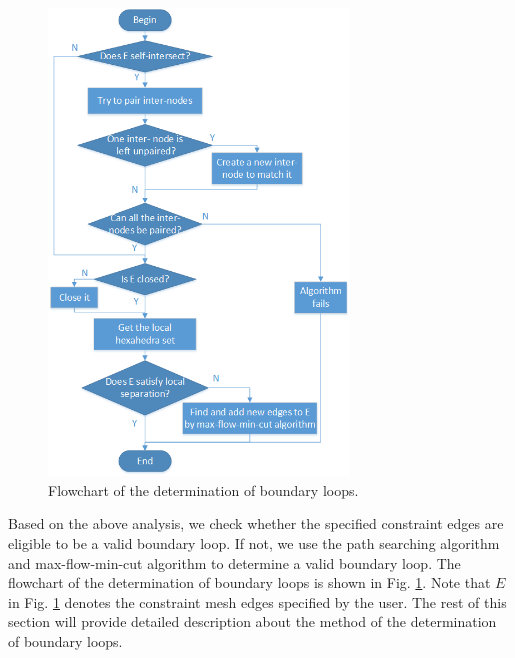 \documentclass[final,5p,times,twocolumn]{elsarticle}
\begin{document}
\begin{figure}[htbp]
\begin{center}
\includegraphics[width=8cm]{figures/flow_det_loop.png}
\caption{Flowchart of the determination of boundary loops.}
\label{fig:flow_det_loop}
\end{center}
\end{figure}

Based on the above analysis, we check whether the specified constraint edges are eligible to be a valid boundary loop. If not, we use the path searching algorithm and max-flow-min-cut algorithm to determine a valid boundary loop. The flowchart of the determination of boundary loops is shown in Fig. \ref{fig:flow_det_loop}. Note that $E$ in Fig. \ref{fig:flow_det_loop} denotes the constraint mesh edges specified by the user. The rest of this section will provide detailed description about the method of the determination of boundary loops.

\end{document}
